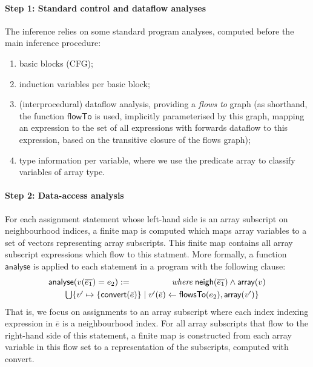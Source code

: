 \documentclass[9pt]{sigplanconf}
\newcounter{block}
\theoremstyle{definition}
\newcommand{\neigh}{\textsf{neigh}}
\newcommand{\arrayTy}{\textsf{array}}
\begin{document}
\paragraph{Step 1: Standard control and dataflow analyses}
The inference relies on some standard program analyses, computed
before the main inference procedure:
%
\begin{enumerate}
\item basic blocks (CFG);
\item induction variables per basic block;
\item (interprocedural) dataflow analysis, providing a \emph{flows to}
  graph (as shorthand, the function
  $\mathsf{flowTo}$ is used, implicitly parameterised by this graph,  
  mapping an expression to the set of all expressions
  with forwards dataflow to this expression, based on the transitive
  closure of the flows graph);
\item type information per variable, where we use the predicate
\arrayTy{} to classify variables of array type. 
\end{enumerate}
%

\paragraph{Step 2: Data-access analysis}

For each assignment statement whose left-hand side is an array
subscript on neighbourhood indices, a finite map is computed which
maps array variables to a set of vectors representing array
subscripts.  This finite map contains all array subscript expressions
which flow to this statment. More formally, a function
$\textsf{analyse}$ is applied to each statement in a program with the
following clause:
%
\begin{align*}
\begin{array}{lr}
\textsf{analyse}(v(\overline{e_1}) = e_2)
 := \qquad\qquad & \textit{where} \; \neigh(\overline{e_1}) \wedge \arrayTy(v)  \\[0.3em]
\multicolumn{2}{l}{\qquad \bigcup\{v' \mapsto \{\textsf{convert}(\bar{e})\} \mid v'(\bar{e}) \leftarrow \mathsf{flowsTo}(e_2),
  \arrayTy(v')\}}
\end{array}
\end{align*}
%
That is, we focus on assignments to an array subscript where each
index indexing expression in $\bar{e}$ is a neighbourhood index.  For
all array subscripts that flow to the right-hand side of this
statement, a finite map is constructed from each array variable
in this flow set to a representation of the subscripts, computed
with \textsf{convert}.
\end{document}
